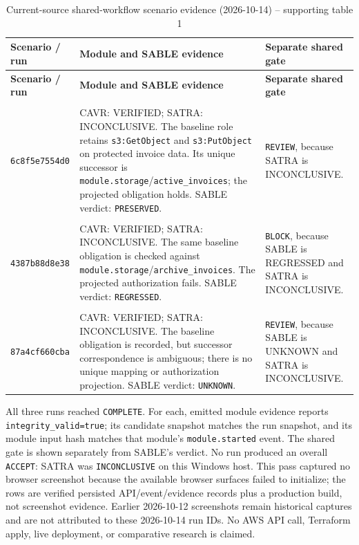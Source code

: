 \small
\setlength{\tabcolsep}{4pt}
\begin{longtable}{p{}p{}p{}}
\caption{Current-source shared-workflow scenario evidence (2026-10-14) -- supporting table 1}\\
\toprule
\textbf{Scenario / run} & \textbf{Module and SABLE evidence} & \textbf{Separate shared gate}\\
\midrule
\endfirsthead
\toprule
\textbf{Scenario / run} & \textbf{Module and SABLE evidence} & \textbf{Separate shared gate}\\
\midrule
\endhead
\shortstack[l]{\texttt{sable\_preserved}\\\texttt{6c8f5e7554d0}} & CAVR: VERIFIED; SATRA: INCONCLUSIVE. The baseline role retains \texttt{s3:GetObject} and \texttt{s3:PutObject} on protected invoice data. Its unique successor is \texttt{module.storage}/\texttt{active\_invoices}; the projected obligation holds. SABLE verdict: \texttt{PRESERVED}. & \texttt{REVIEW}, because SATRA is INCONCLUSIVE.\\
\shortstack[l]{\texttt{sable\_regressed}\\\texttt{4387b88d8e38}} & CAVR: VERIFIED; SATRA: INCONCLUSIVE. The same baseline obligation is checked against \texttt{module.storage}/\texttt{archive\_invoices}. The projected authorization fails. SABLE verdict: \texttt{REGRESSED}. & \texttt{BLOCK}, because SABLE is REGRESSED and SATRA is INCONCLUSIVE.\\
\shortstack[l]{\texttt{sable\_unknown}\\\texttt{87a4cf660cba}} & CAVR: VERIFIED; SATRA: INCONCLUSIVE. The baseline obligation is recorded, but successor correspondence is ambiguous; there is no unique mapping or authorization projection. SABLE verdict: \texttt{UNKNOWN}. & \texttt{REVIEW}, because SABLE is UNKNOWN and SATRA is INCONCLUSIVE.\\
\bottomrule
\end{longtable}
\normalsize
\setlength{\tabcolsep}{6pt}

All three runs reached \texttt{COMPLETE}. For each, emitted module evidence reports \texttt{integrity\_valid=true}; its candidate snapshot matches the run snapshot, and its module input hash matches that module's \texttt{module.started} event. The shared gate is shown separately from SABLE's verdict. No run produced an overall \texttt{ACCEPT}: SATRA was \texttt{INCONCLUSIVE} on this Windows host. This pass captured no browser screenshot because the available browser surfaces failed to initialize; the rows are verified persisted API/event/evidence records plus a production build, not screenshot evidence. Earlier 2026-10-12 screenshots remain historical captures and are not attributed to these 2026-10-14 run IDs. No AWS API call, Terraform apply, live deployment, or comparative research is claimed.

